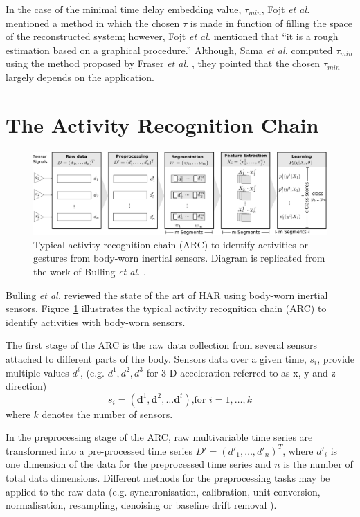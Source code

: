 \documentclass[10pt,journal,compsoc]{IEEEtran}
\begin{document}
In the case of the minimal time delay embedding value, $\tau_{min}$,
Fojt \emph{et al.} \cite{Fojt1998} mentioned a method in which the chosen $\tau$ 
is made in function of filling the space of the reconstructed system;
however, Fojt \emph{et al.} \cite{Fojt1998} mentioned
that ``it is a rough estimation based on a graphical procedure.''
Although, Sama \emph{et al.} \cite{Sama2013} computed $\tau_{min}$ using 
the method proposed by Fraser \emph{et al.} \cite{Fraser1986}, 
they pointed that the chosen $\tau_{min}$ largely depends on the application.


\section{The Activity Recognition Chain}

\begin{figure}
\centering    
\includegraphics[width=\textwidth]{ARC02}
\caption[PA]{Typical activity recognition chain (ARC) to identify activities or gestures
from body-worn inertial sensors. 
Diagram is replicated from the work of Bulling \emph{et al.} \cite{bulling2014}.}
\label{fig:arc}
\end{figure}

Bulling \emph{et al.} \cite{bulling2014} reviewed the state of the art of
HAR using body-worn inertial sensors.
Figure~\ref{fig:arc} illustrates the typical activity recognition chain (ARC) to identify
activities with body-worn sensors. 

The first stage of the ARC is the raw data collection from several sensors attached to 
different parts of the body. Sensors data over a given time, $s_i$, provide multiple values  $d^i$, 
(e.g. $d^1, d^2, d^3$ for 3-D acceleration referred to as x, y and z direction)
\begin{equation}
s_i = (\textbf{d}^1, \textbf{d}^2,\dots \textbf{d}^t) \mbox{,for } i=1, \dots,k
\end{equation} 
where $k$ denotes the number of sensors. 

In the preprocessing stage of the ARC, raw multivariable time series are transformed into a 
pre-processed time series $D'= (d'_1, \dots, d'_n )^T$, where $d'_i$ is one dimension 
of the data for the preprocessed time series and $n$ is the number of total data dimensions.
Different methods for the preprocessing tasks may be applied to the raw data
(e.g. synchronisation, calibration, unit conversion, normalisation, resampling, denoising 
or baseline drift removal \cite{bulling2014}).
\end{document}
